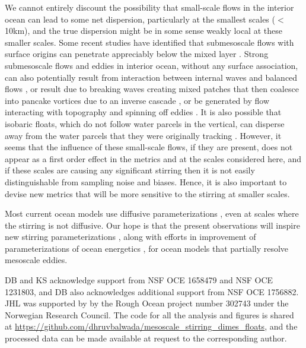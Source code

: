 \documentclass[]{ametsoc}
\begin{document}
We cannot entirely discount the possibility that small-scale flows in the interior ocean can lead to some net dispersion, particularly at the smallest scales ($<$10km), and the true dispersion might be in some sense weakly local at these smaller scales. Some recent studies have identified that submesoscale flows with surface origins can penetrate appreciably below the mixed layer \citep{yu2019annual, siegelman2020energetic}. Strong submesoscale flows and eddies in interior ocean, without any surface association, can also potentially result from interaction between internal waves and balanced flows \citep{thomas2019geophysical}, or result due to breaking waves creating mixed patches that then coalesce into pancake vortices due to an inverse cascade \citep{sundermeyer2005stirring, polzin2004isopycnal}, or be generated by flow interacting with topography and spinning off eddies \citep{srinivasan2019submesoscale, vic2018dispersion, bracco2016submesoscale}. It is also possible that isobaric floats, which do not follow water parcels in the vertical, can disperse away from the water parcels that they were originally tracking \citep{dewar1980effect}. However, it seems that the influence of these small-scale flows, if they are present, does not appear as a first order effect in the metrics and at the scales considered here, and if these scales are causing any significant stirring then it is not easily distinguishable from sampling noise and biases. Hence, it is also important to devise new metrics that will be more sensitive to the stirring at smaller scales. 

Most current ocean models use diffusive parameterizations \citep{fox2019challenges}, even at scales where the stirring is not diffusive. Our hope is that the present observations will inspire new stirring parameterizations \citep[e.g.][]{kampf2016towards}, along with efforts in improvement of parameterizations of ocean energetics \citep{bachman2017scale, zanna2019}, for ocean models that partially resolve mesoscale eddies.


\acknowledgments DB and KS acknowledge support from NSF OCE 1658479 and NSF OCE 1231803, and DB also acknowledges additional support from NSF OCE 1756882. JHL was supported by by the Rough Ocean project number 302743 under the Norwegian Research Council. The code for all the analysis and figures is shared at \url{https://github.com/dhruvbalwada/mesoscale_stirring_dimes_floats}, and the processed data can be made available at request to the corresponding author.
\end{document}
